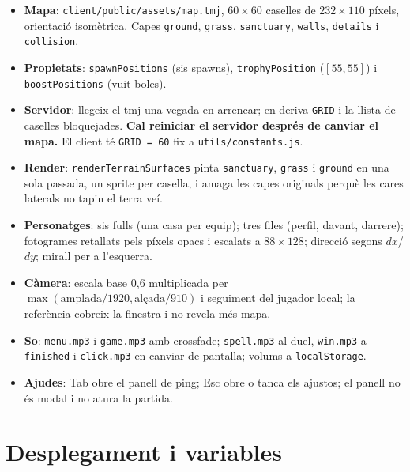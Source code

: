 \documentclass[10pt,a4paper]{article}
\begin{document}
\begin{itemize}[nosep]
  \item \textbf{Mapa}: \texttt{client/public/assets/map.tmj}, $60 \times 60$ caselles de
        $232 \times 110$ píxels, orientació isomètrica. Capes \texttt{ground},
        \texttt{grass}, \texttt{sanctuary}, \texttt{walls}, \texttt{details} i
        \texttt{collision}.
  \item \textbf{Propietats}: \texttt{spawnPositions} (sis spawns),
        \texttt{trophyPosition} ($[55,55]$) i \texttt{boostPositions} (vuit boles).
  \item \textbf{Servidor}: llegeix el tmj una vegada en arrencar; en deriva
        \texttt{GRID} i la llista de caselles bloquejades. \textbf{Cal reiniciar el
        servidor després de canviar el mapa.} El client té \texttt{GRID = 60} fix a
        \texttt{utils/constants.js}.
  \item \textbf{Render}: \texttt{renderTerrainSurfaces} pinta \texttt{sanctuary},
        \texttt{grass} i \texttt{ground} en una sola passada, un sprite per casella, i
        amaga les capes originals perquè les cares laterals no tapin el terra veí.
  \item \textbf{Personatges}: sis fulls (una casa per equip); tres files (perfil,
        davant, darrere); fotogrames retallats pels píxels opacs i escalats a
        $88 \times 128$; direcció segons $dx$/$dy$; mirall per a l'esquerra.
  \item \textbf{Càmera}: escala base 0,6 multiplicada per
        $\max(\text{amplada}/1920, \text{alçada}/910)$ i seguiment del jugador local;
        la referència cobreix la finestra i no revela més mapa.
  \item \textbf{So}: \texttt{menu.mp3} i \texttt{game.mp3} amb crossfade;
        \texttt{spell.mp3} al duel, \texttt{win.mp3} a \texttt{finished} i
        \texttt{click.mp3} en canviar de pantalla; volums a \texttt{localStorage}.
  \item \textbf{Ajudes}: Tab obre el panell de ping; Esc obre o tanca els ajustos; el
        panell no és modal i no atura la partida.
\end{itemize}

\section{Desplegament i variables}
\end{document}
